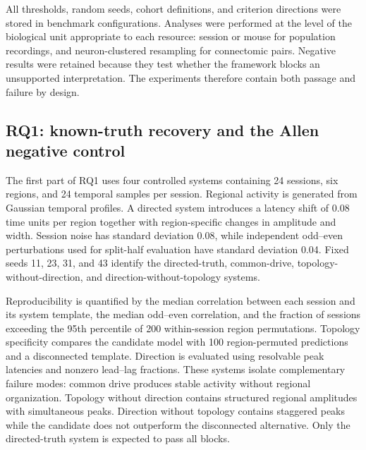 \documentclass[a4paper,fleqn]{cas-sc}
\begin{document}
All thresholds, random seeds, cohort definitions, and criterion directions were
stored in benchmark configurations. Analyses were performed at the level of the
biological unit appropriate to each resource: session or mouse for population
recordings, and neuron-clustered resampling for connectomic pairs. Negative
results were retained because they test whether the framework blocks an
unsupported interpretation. The experiments therefore contain both passage and
failure by design.


\subsection{RQ1: known-truth recovery and the Allen negative control}
\label{subsec:rq1-known-truth-allen}

The first part of RQ1 uses four controlled systems containing 24 sessions, six
regions, and 24 temporal samples per session. Regional activity is generated
from Gaussian temporal profiles. A directed system introduces a latency shift
of 0.08 time units per region together with region-specific changes in amplitude
and width. Session noise has standard deviation 0.08, while independent
odd--even perturbations used for split-half evaluation have standard deviation
0.04. Fixed seeds 11, 23, 31, and 43 identify the directed-truth, common-drive,
topology-without-direction, and direction-without-topology systems.

Reproducibility is quantified by the median correlation between each session
and its system template, the median odd--even correlation, and the fraction of
sessions exceeding the 95th percentile of 200 within-session region
permutations. Topology specificity compares the candidate model with 100
region-permuted predictions and a disconnected template. Direction is evaluated
using resolvable peak latencies and nonzero lead--lag fractions. These systems
isolate complementary failure modes: common drive produces stable activity
without regional organization. Topology without direction contains structured
regional amplitudes with simultaneous peaks. Direction without topology
contains staggered peaks while the candidate does not outperform the
disconnected alternative. Only the directed-truth system is expected to pass
all blocks.
\end{document}
